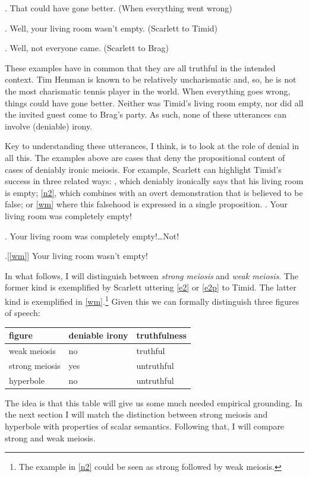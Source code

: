 \documentclass[a4paper,12pt,twoside]{article}
\begin{document}
\ex. That could have gone better. (When everything went wrong)

\ex. \label{wm}Well, your living room wasn't empty. (Scarlett to Timid)

\ex.\label{henmanb} Well, not everyone came. (Scarlett to Brag)

These examples have in common that they are all truthful in the intended context. Tim Henman is known to be relatively uncharismatic and, so, he is not the most charismatic tennis player in the world. When everything goes wrong, things could have gone better. Neither was Timid's living room empty, nor did all the invited guest come to Brag's party. As such, none of these utterances can involve (deniable) irony.

Key to understanding these utterances, I think, is to look at the role of denial in all this. The examples above are cases that deny the propositional content of cases of deniably ironic meiosis. For example, Scarlett can highlight Timid's success  in three related ways: \Next, which deniably ironically says that his living room is empty; \ref{n2}, which combines \Next with an overt demonstration that \Next is believed to be false; or \ref{wm} where this falsehood is expressed in a single proposition.
\ex. Your living room was completely empty!\label{e2p}

\ex.\label{n2} Your living room was completely empty!\ldots{}Not!

\ex.[\ref{wm}] Your living room wasn't empty!

In what follows, I will distinguish between \emph{strong meiosis} and \emph{weak meiosis}. The former kind is exemplified by Scarlett uttering \ref{e2} or \ref{e2p} to Timid. The latter kind is exemplified in \ref{wm}.\footnote{The example in \ref{n2} could be seen as strong followed by weak meiosis.} Given this we can formally distinguish three figures of speech:

\begin{center}
\begin{tabular}{l|ll}
figure & deniable irony & truthfulness\\
\hline
weak meiosis & no & truthful\\
strong meiosis & yes & untruthful\\
hyperbole & no & untruthful\\
\end{tabular}
\end{center}

\noindent The idea is that this table will give us some much needed empirical grounding. In the next section I will match the distinction between strong meiosis and hyperbole with properties of scalar semantics. Following that, I will compare strong and weak meiosis. 
\end{document}
